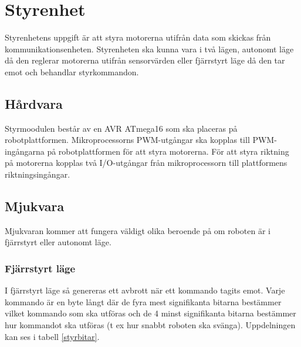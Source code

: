 \section{Styrenhet}
Styrenhetens uppgift är att styra motorerna utifrån data som skickas från kommunikationsenheten.
Styrenheten ska kunna vara i två lägen, autonomt läge då den reglerar motorerna utifrån sensorvärden eller 
fjärrstyrt läge då den tar emot och behandlar styrkommandon.
\subsection{Hårdvara}
Styrmoodulen består av en AVR ATmega16 som ska placeras på robotplattformen.
Mikroprocessorns PWM-utgångar ska kopplas till PWM-ingångarna på robotplattformen för att styra motorerna.
För att styra riktning på motorerna kopplas två I/O-utgångar från mikroprocessorn till plattformens riktningsingångar.
\subsection{Mjukvara}
Mjukvaran kommer att fungera väldigt olika beroende på om roboten är i fjärrstyrt eller autonomt läge.
\subsubsection{Fjärrstyrt läge}
I fjärrstyrt läge så genereras ett avbrott när ett kommando tagits emot.
Varje kommando är en byte långt där de fyra mest signifikanta bitarna bestämmer vilket kommando som ska utföras
och de 4 minst signifikanta bitarna bestämmer hur kommandot ska utföras (t ex hur snabbt roboten ska svänga).
Uppdelningen kan ses i tabell \ref{styrbitar}.

